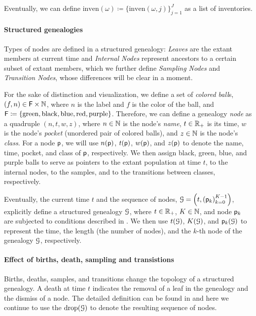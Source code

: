 \documentclass[11pt,reqno,final]{amsart}\usepackage[]{graphicx}\usepackage[]{color}
\begin{document}
Eventually, we can define $\mathrm{inven}(\omega)\coloneqq\{\mathrm{inven}(\omega,j)\}_{j=1}^J$ as a list of inventories.

\paragraph{Structured genealogies}
Types of nodes are defined in a structured genealogy: \emph{Leaves} are the extant members at current time and \emph{Internal Nodes} represent ancestors to a certain subset of extant members, which we further define \emph{Sampling Nodes} and \emph{Transition Nodes}, whose differences will be clear in a moment.

For the sake of distinction and visualization, we define a set of \emph{colored ball}s, $(f,n)\in\mathsf{F}\times\mathbb{N}$, where $n$ is the label and $f$ is the color of the ball, and $\mathsf{F}\coloneqq\{\mathrm{green},\mathrm{black},\mathrm{blue},\mathrm{red},\mathrm{purple}\}$. Therefore, we can define a genealogy \emph{node} as a quadruple $(n,t,w,z)$, where $n\in\mathbb{N}$ is the node's \emph{name}, $t\in\mathbb{R}_{+}$ is its time, $w$ is the node's \emph{pocket} (\ie unordered pair of colored balls), and $z\in\mathbb{N}$ is the node's \emph{class}. For a node $\mathsf{p}$, we will use $n(\mathsf{p})$, $t(\mathsf{p})$, $w(\mathsf{p})$, and $z(\mathsf{p})$ to denote the name, time, pocket, and class of $\mathsf{p}$, respectively. We then assign black, green, blue, and purple balls to serve as pointers to the extant population at time $t$, to the internal nodes, to the samples, and to the transitions between classes, respectively.

Eventually, the current time $t$ and the sequence of nodes, $\mathcal{G}=\left(t,\left(\mathsf{p}_k\right)_{k=0}^{K-1}\right)$, explicitly define a structured genealogy $\mathcal{G}$, where $t\in\mathbb{R}_{+}$, $K\in\mathbb{N}$, and node $\mathsf{p}_k$ are subjected to conditions described in \citet{King2021}. We then use $t(\mathcal{G})$, $K(\mathcal{G})$, and $\mathsf{p}_k(\mathcal{G})$ to represent the time, the length (\ie the number of nodes), and the $k$-th node of the genealogy $\mathcal{G}$, respectively.

\paragraph{Effect of births, death, sampling and transistions}

Births, deaths, samples, and transitions change the topology of a structured genealogy. A death at time $t$ indicates the removal of a leaf in the genealogy and the dismiss of a node. The detailed definition can be found in \citet{King2021} and here we continue to use the $\mathrm{drop}(\mathcal{G})$ to denote the resulting sequence of nodes.
\end{document}
